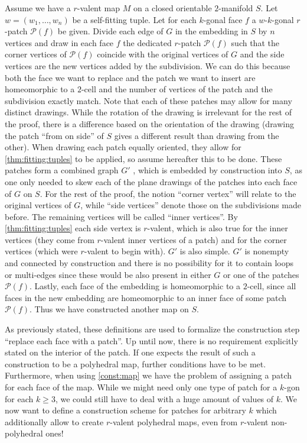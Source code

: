 \begin{construction}\label{const:map}
  Assume we have a $r$-valent map $M$ on a closed orientable $2$-manifold $S$. Let $w = (w_1, \dots, w_n)$ be a self-fitting tuple. Let for each $k$-gonal face $f$ a $w$-$k$-gonal $r$-patch $\mathcal{P}(f)$ be given. Divide each edge of $G$ in the embedding in $S$ by $n$ vertices and draw in each face $f$ the dedicated $r$-patch $\mathcal{P}(f)$ such that the corner vertices of $\mathcal{P}(f)$ coincide with the original vertices of $G$ and the side vertices are the new vertices added by the subdivision. We can do this because both the face we want to replace and the patch we want to insert are homeomorphic to a $2$-cell and the number of vertices of the patch and the subdivision exactly match. Note that each of these patches may allow for many distinct drawings. While the rotation of the drawing is irrelevant for the rest of the proof, there is a difference based on the orientation of the drawing (drawing the patch “from on side” of $S$ gives a different result than drawing from the other). When drawing each patch equally oriented, they allow for \autoref{thm:fitting:tuples} to be applied, so assume hereafter this to be done. These patches form a combined graph $G'$ , which is embedded by construction into $S$, as one only needed to skew each of the plane drawings of the patches into each face of $G$ on $S$. For the rest of the proof, the notion ``corner vertex'' will relate to the original vertices of $G$, while ``side vertices'' denote those on the subdivisions made before. The remaining vertices will be called ``inner vertices''. By \autoref{thm:fitting:tuples} each side vertex is $r$-valent, which is also true for the inner vertices (they come from $r$-valent inner vertices of a patch) and for the corner vertices (which were $r$-valent to begin with). $G'$ is also simple. $G'$ is nonempty and connected by construction and there is no possibility for it to contain loops or multi-edges since these would be also present in either $G$ or one of the patches $\mathcal{P}(f)$. Lastly, each face of the embedding is homeomorphic to a $2$-cell, since all faces in the new embedding are homeomorphic to an inner face of some patch $\mathcal{P}(f)$. Thus we have constructed another map on $S$.
\end{construction}

As previously stated, these definitions are used to formalize the construction step ``replace each face with a patch''. Up until now, there is no requirement explicitly stated on the interior of the patch. If one expects the result of such a construction to be a polyhedral map, further conditions have to be met. Furthermore, when using \autoref{const:map} we have the problem of assigning a patch for each face of the map. While we might need only one type of patch for a $k$-gon for each $k \geq 3$, we could still have to deal with a huge amount of values of $k$. We now want to define a construction scheme for patches for arbitrary $k$ which additionally allow to create $r$-valent polyhedral maps, even from $r$-valent non-polyhedral ones!

